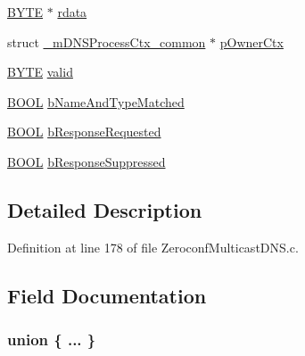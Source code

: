 \begin{DoxyCompactItemize}
\begin{tabbing}
\end{tabbing}\item 
\hyperlink{_generic_type_defs_8h_a4ae1dab0fb4b072a66584546209e7d58}{B\+Y\+T\+E} $\ast$ \hyperlink{struct__m_d_n_s_resource_record_aac1fbe6e2e3029adacb4d570c7f6900c}{rdata}
\item 
struct \hyperlink{struct__m_d_n_s_process_ctx__common}{\+\_\+m\+D\+N\+S\+Process\+Ctx\+\_\+common} $\ast$ \hyperlink{struct__m_d_n_s_resource_record_a17a6eba9a7fe3cd1c3312e0d3bacc735}{p\+Owner\+Ctx}
\item 
\hyperlink{_generic_type_defs_8h_a4ae1dab0fb4b072a66584546209e7d58}{B\+Y\+T\+E} \hyperlink{struct__m_d_n_s_resource_record_a7c54cb0f9753b90be7ae144001428829}{valid}
\item 
\hyperlink{_generic_type_defs_8h_a54d65c7fa62e62c9754371e42f5111b9}{B\+O\+O\+L} \hyperlink{struct__m_d_n_s_resource_record_a0c56094453067069894f36b474fe6937}{b\+Name\+And\+Type\+Matched}
\item 
\hyperlink{_generic_type_defs_8h_a54d65c7fa62e62c9754371e42f5111b9}{B\+O\+O\+L} \hyperlink{struct__m_d_n_s_resource_record_a20ac22a1e4fb67a4ae0b833549256a22}{b\+Response\+Requested}
\item 
\hyperlink{_generic_type_defs_8h_a54d65c7fa62e62c9754371e42f5111b9}{B\+O\+O\+L} \hyperlink{struct__m_d_n_s_resource_record_a6c797734e12d3891e823bc12596f9e77}{b\+Response\+Suppressed}
\end{DoxyCompactItemize}


\subsection{Detailed Description}


Definition at line 178 of file Zeroconf\+Multicast\+D\+N\+S.\+c.



\subsection{Field Documentation}
\hypertarget{struct__m_d_n_s_resource_record_a74f4f9be5c0d908aa0281456e7b92dda}{}\subsubsection[{"@508}]{\setlength{\rightskip}{0pt plus 5cm}union \{ ... \} }\label{struct__m_d_n_s_resource_record_a74f4f9be5c0d908aa0281456e7b92dda}
\hypertarget{struct__m_d_n_s_resource_record_a0c56094453067069894f36b474fe6937}{}
